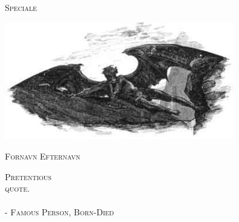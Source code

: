 

\begin{center}
\textsc{\Large Speciale}\\[0.5cm] %
%
\thesistitle

\includegraphics[width=0.75\textwidth]{pics/logo}%

\vfill 

\textsc{\huge Fornavn Efternavn}%
 
\end{center}
\thispagestyle{empty}

\clearpage
{\phantom{} \vspace{-7mm}}
\vspace{7cm}
\begin{center}
\textsc{
Pretentious  \\ quote.
}
\ \\
\ \\

\textsc{
- Famous Person, Born-Died
}
\end{center}
\thispagestyle{empty}

\clearpage




